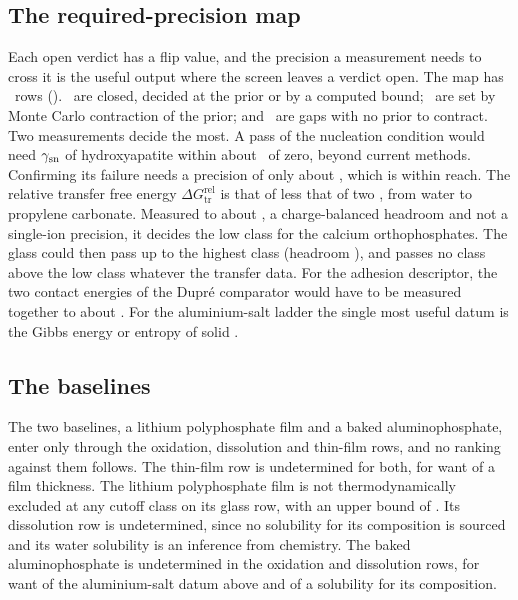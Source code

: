 \subsection{The required-precision map}\label{sec:res-precision}
Each open verdict has a flip value, and the precision a measurement needs to cross it is the useful output where the screen leaves a verdict open. %
The map has \NumPrecRows\ rows (). %
\NumPrecClosed\ are closed, decided at the prior or by a computed bound; \NumPrecMonteCarlo\ are set by Monte Carlo contraction of the prior; and \NumPrecGap\ are gaps with no prior to contract. %
Two measurements decide the most. %
A pass of the nucleation condition would need $\gamma_\mathrm{sn}$ of hydroxyapatite within about \NumNucDecideWithin\ of zero, beyond current methods. %
Confirming its failure needs a precision of only about \NumPrecGammaSnConfirm, which is within reach. %
The relative transfer free energy $\Delta G_\mathrm{tr}^\mathrm{rel}$ is that of  less that of two , from water to propylene carbonate. %
Measured to about \NumPrecTransferCaKj, a charge-balanced headroom and not a single-ion precision, it decides the low class for the calcium orthophosphates. %
The  glass could then pass up to the highest class (headroom \NumPrecMetaGlassHiHeadroom), and  passes no class above the low class whatever the transfer data. %
For the adhesion descriptor, the two contact energies of the Dupr\'e comparator would have to be measured together to about \NumPrecDupreMj. %
For the aluminium-salt ladder the single most useful datum is the Gibbs energy or entropy of solid . %

\subsection{The baselines}\label{sec:res-baselines}
The two baselines, a lithium polyphosphate film and a baked aluminophosphate, enter only through the oxidation, dissolution and thin-film rows, and no ranking against them follows. %
The thin-film row is undetermined for both, for want of a film thickness. %
The lithium polyphosphate film is not thermodynamically excluded at any cutoff class on its glass row, with an upper bound of \NumLipoGlassOnset. %
Its dissolution row is undetermined, since no solubility for its composition is sourced and its water solubility is an inference from chemistry. %
The baked aluminophosphate is undetermined in the oxidation and dissolution rows, for want of the aluminium-salt datum above and of a solubility for its composition. %
